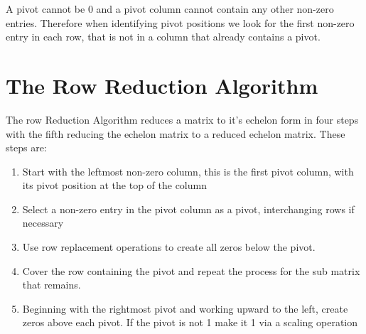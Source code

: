 \documentclass[12pt letter]{report}
\begin{document}
A pivot cannot be 0 and a pivot column cannot contain any other non-zero entries. Therefore when identifying pivot
positions we look for the first non-zero entry in each row, that is not in a column that already contains a pivot.


\section{The Row Reduction Algorithm}

The row Reduction Algorithm reduces a matrix to it's echelon form in four steps with the fifth reducing the echelon
matrix to a reduced echelon matrix. These steps are:
\begin{enumerate}
  \item Start with the leftmost non-zero column, this is the first pivot column, with its pivot position at the top of
        the column
  \item Select a non-zero entry in the pivot column as a pivot, interchanging rows if necessary
  \item Use row replacement operations to create all zeros below the pivot.
  \item Cover the row containing the pivot and repeat the process for the sub matrix that remains.
  \item Beginning with the rightmost pivot and working upward to the left, create zeros above each pivot. If the pivot
        is not 1 make it 1 via a scaling operation
\end{enumerate}
\end{document}

